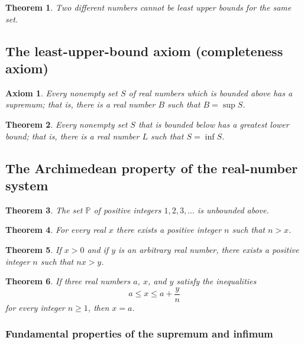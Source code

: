 \documentclass{article}
\newtheorem{axiom}{Axiom}[section]
\newtheorem{theorem}{Theorem}[section]
\begin{document}
\begin{theorem}
Two different numbers cannot be least upper bounds for the same set.
\end{theorem}

\subsection{The least-upper-bound axiom (completeness axiom)}

\begin{axiom}
Every nonempty set \(S\) of real numbers which is bounded above has a supremum; that is, there is a real number \(B\) such that \(B = \sup S\).
\end{axiom}

\begin{theorem}
Every nonempty set \(S\) that is bounded below has a greatest lower bound; that is, there is a real number \(L\) such that \(S = \inf S\).
\end{theorem}

\subsection{The Archimedean property of the real-number system}

\begin{theorem}
The set \(\mathbb{P}\) of positive integers \(1, 2, 3, ...\) is unbounded above.
\end{theorem}

\begin{theorem}
For every real \(x\) there exists a positive integer \(n\) such that \(n > x\).
\end{theorem}

\begin{theorem}
If \(x > 0\) and if \(y\) is an arbitrary real number, there exists a positive integer \(n\) such that \(nx > y\).
\end{theorem}

\begin{theorem}
If three real numbers \(a\), \(x\), and \(y\) satisfy the inequalities
\[
a \leq x \leq a + \frac{y}{n}
\]
for every integer \(n \geq 1\), then \(x = a\).
\end{theorem}

\subsubsection{Fundamental properties of the supremum and infimum}
\end{document}
